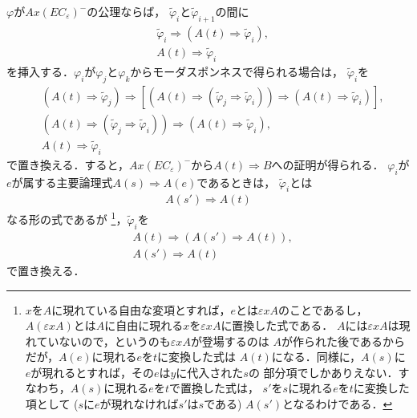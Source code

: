	$\varphi$が$Ax(EC_{\varepsilon})^{-}$の公理ならば，
	$\tilde{\varphi}_{i}$と$\tilde{\varphi}_{i+1}$の間に
	\begin{align}
		&\tilde{\varphi}_{i} \Longrightarrow 
		\left( A(t) \Longrightarrow \tilde{\varphi}_{i} \right), \\
		&A(t) \Longrightarrow \tilde{\varphi}_{i}
	\end{align}
	を挿入する．$\varphi_{i}$が$\varphi_{j}$と$\varphi_{k}$からモーダスポンネスで得られる場合は，
	$\tilde{\varphi}_{i}$を
	\begin{align}
		&\left( A(t) \Longrightarrow \tilde{\varphi}_{j} \right)
		\Longrightarrow \left[ \left( A(t) \Longrightarrow 
		\left( \tilde{\varphi}_{j}\Longrightarrow \tilde{\varphi}_{i} \right) \right)
		\Longrightarrow \left( A(t) \Longrightarrow \tilde{\varphi}_{i} \right) \right], \\
		&\left( A(t) \Longrightarrow 
		\left( \tilde{\varphi}_{j}\Longrightarrow \tilde{\varphi}_{i} \right) \right)
		\Longrightarrow \left( A(t) \Longrightarrow \tilde{\varphi}_{i} \right), \\
		&A(t) \Longrightarrow \tilde{\varphi}_{i}
	\end{align}
	で置き換える．すると，$Ax(EC_{\varepsilon})^{-}$から$A(t) \Longrightarrow B$への証明が得られる．
	$\varphi_{i}$が$e$が属する主要論理式$A(s) \Longrightarrow A(e)$であるときは，
	$\tilde{\varphi}_{i}$とは
	\begin{align}
		A(s') \Longrightarrow A(t)
	\end{align}
	なる形の式であるが
	\footnote{
		$x$を$A$に現れている自由な変項とすれば，$e$とは$\varepsilon x A$のことであるし，
		$A(\varepsilon x A)$とは$A$に自由に現れる$x$を$\varepsilon x A$に置換した式である．
		$A$には$\varepsilon x A$は現れていないので，というのも$\varepsilon x A$が登場するのは
		$A$が作られた後であるからだが，$A(e)$に現れる$e$を$t$に変換した式は
		$A(t)$になる．同様に，$A(s)$に$e$が現れるとすれば，その$e$は$y$に代入された$s$の
		部分項でしかありえない．すなわち，$A(s)$に現れる$e$を$t$で置換した式は，
		$s'$を$s$に現れる$e$を$t$に変換した項として ($s$に$e$が現れなければ$s'$は$s$である)
		$A(s')$となるわけである．
	}，$\tilde{\varphi}_{i}$を
	\begin{align}
		&A(t) \Longrightarrow (A(s') \Longrightarrow A(t)), \\
		&A(s') \Longrightarrow A(t)
	\end{align}
	で置き換える．
	
